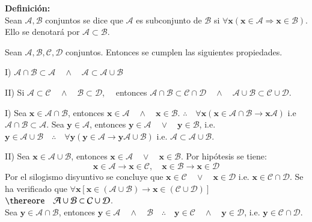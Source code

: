 \textbf{Definición:}\\
Sean $\mathcal{A,B}$ conjuntos se dice que $\mathcal{A}$ es subconjunto de $\mathcal{B}$ si $\forall \mathbf{x}(\mathbf{x}\in\mathcal{A} \Longrightarrow \mathbf{x}\in\mathcal{B})$. Ello se denotará por $\mathcal{A}\subset\mathcal{B}$.\\

\begin{proposition}
Sean $\mathcal{A,B,C,D}$ conjuntos. Entonces se cumplen las siguientes propiedades. 
	\begin{iteritem}
	\item I) $\mathcal{A}\cap\mathcal{B} \subset \mathcal{A} \quad \wedge \quad \mathcal{A} \subset \mathcal{A}\cup\mathcal{B}$
	\item II) Si $\mathcal{A}\subset\mathcal{C}\quad\wedge\quad\mathcal{B}\subset\mathcal{D}$,$\quad$ entonces $\mathcal{A}\cap\mathcal{B}\subset\mathcal{C}\cap\mathcal{D}\quad\wedge\quad\mathcal{A}\cup\mathcal{B}\subset\mathcal{C}\cup\mathcal{D}$.
	\end{iteritem}
\end{proposition}
\begin{proof2}
	\begin{iteritem}
	\item I) Sea $\mathbf{x}\in\mathcal{A}\cap\mathcal{B}$, entonces $\mathbf{x}\in\mathcal{A} \quad\wedge\quad \mathbf{x}\in\mathcal{B}$.
		$\therefore\quad\forall\mathbf{x}(\mathbf{x}\in\mathcal{A}\cap\mathcal{B}\longrightarrow\mathbf{x}\mathcal{A})$ i.e $\mathcal{A}\cap\mathcal{B}\subset\mathcal{A}$. Sea $\mathbf{y}\in\mathcal{A}$, entonces $\mathbf{y}\in\mathcal{A}\quad\vee\quad\mathbf{y}\in\mathcal{B}$, i.e. $\mathbf{y}\in\mathcal{A}\cup\mathcal{B} \quad\therefore\quad\forall\mathbf{y}(\mathbf{y}\in\mathcal{A}\longrightarrow\mathbf{y}\mathcal{A}\cup\mathcal{B})$ i.e. $\mathcal{A}\subset\mathcal{A}\cup\mathcal{B}$. 
	\item II) Sea $\mathbf{x}\in\mathcal{A}\cup\mathcal{B}$, entonces $\mathbf{x}\in\mathcal{A}\quad\vee\quad\mathbf{x}\in\mathcal{B}$. Por hipótesis se tiene:
\[\mathbf{x}\in\mathcal{A}\longrightarrow\mathbf{x}\in\mathcal{C},\quad\mathbf{x}\in\mathcal{B}\longrightarrow\mathbf{x}\in\mathcal{D}\]
		Por el silogismo disyuntivo se concluye que $\mathbf{x}\in\mathcal{C}\quad\vee\quad\mathbf{x}\in\mathcal{D}$ i.e. $\mathbf{x}\in\mathcal{C}\cap\mathcal{D}$. Se ha verificado que $\forall\mathbf{x}[\mathbf{x}\in(\mathcal{A}\cup\mathcal{B})\longrightarrow\mathbf{x}\in(\mathcal{C}\cup\mathcal{D})]$ $\thereore \quad\mathcal{A}\cup\mathcal{B}\subset\mathcal{C}\cup\mathcal{D}$. \\

Sea $\mathbf{y}\in\mathcal{A}\cap\mathcal{B}$, entonces $\mathbf{y}\in\mathcal{A}\quad\wedge\quad\mathcal{B}\quad\therefore\quad\mathbf{y}\in\mathcal{C}\quad\wedge\quad\mathbf{y}\in\mathcal{D}$, i.e. $\mathbf{y}\in\mathcal{C}\cap\mathcal{D}$.
\end{iteritem}
\end{proof2}

